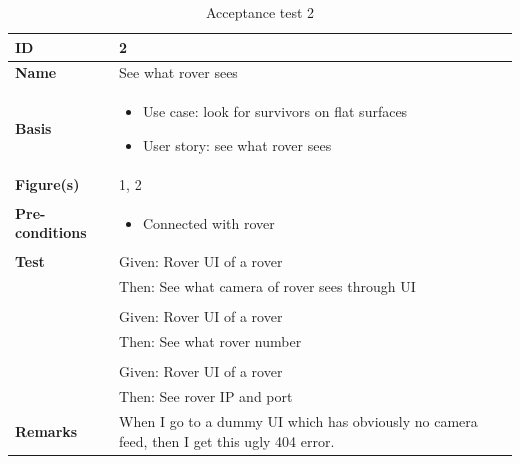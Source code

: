 \documentclass[12pt]{article}
\begin{document}
	\begin{table}[H]
		\centering
		\begin{tabularx}{\linewidth}{|X|X|}
			\hline
			\textbf{ID} &2\\
			\hline
			\textbf{Name} &See what rover sees\\
			\hline
			\textbf{Basis} &\begin{itemize}
				\item Use case: look for survivors on flat surfaces
				\item User story: see what rover sees
			\end{itemize}\\
			\hline
			\textbf{Figure(s)} &1, 2 \\
			\hline
			\textbf{Pre-conditions} & \begin{itemize}
				\item Connected with rover
			\end{itemize}\\
			\hline
			\textbf{Test} &Given: Rover UI of a rover\\
			&Then: See what camera of rover sees through UI\\
			&\\
			&Given: Rover UI of a rover\\
			&Then: See what rover number\\
			&\\	
			&Given: Rover UI of a rover\\
			&Then: See rover IP and port\\
			\hline
			\textbf{Remarks} &When I go to a dummy UI which has obviously no camera feed, then I get this ugly 404 error.\\
			\hline
		\end{tabularx}
		\caption{Acceptance test 2}
		\label{table:Acceptance test 2}   
	\end{table}
\end{document}
